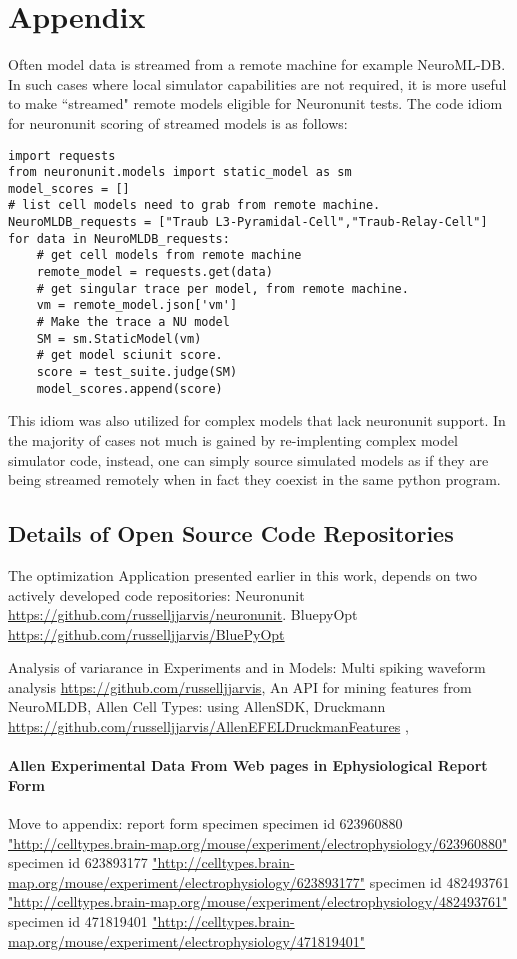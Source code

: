 \chapter{Appendix}

Often model data is streamed from a remote machine for example NeuroML-DB. In such cases where local simulator capabilities are not required, it is more useful to make ``streamed" remote models eligible for Neuronunit tests. The code idiom for neuronunit scoring of  streamed models is as follows:

\begin{verbatim}
import requests
from neuronunit.models import static_model as sm
model_scores = []
# list cell models need to grab from remote machine.
NeuroMLDB_requests = ["Traub L3-Pyramidal-Cell","Traub-Relay-Cell"]
for data in NeuroMLDB_requests:
    # get cell models from remote machine    
    remote_model = requests.get(data)
    # get singular trace per model, from remote machine.
    vm = remote_model.json['vm']
    # Make the trace a NU model
    SM = sm.StaticModel(vm)
    # get model sciunit score.
    score = test_suite.judge(SM)
    model_scores.append(score)
\end{verbatim}
\label{code:idiom2}

This idiom was also utilized for complex models that lack neuronunit support. In the majority of cases not much is gained by re-implenting complex model simulator code, instead, one can simply source simulated models as if they are being streamed remotely when in fact they coexist in the same python program.

\section{Details of Open Source Code Repositories}
The optimization Application presented earlier in this work, depends on two actively developed code repositories:
Neuronunit \url{https://github.com/russelljjarvis/neuronunit}.
BluepyOpt \url{https://github.com/russelljjarvis/BluePyOpt}

Analysis of variarance in Experiments and in Models:
Multi spiking waveform analysis \url{https://github.com/russelljjarvis},
An API for mining features from NeuroMLDB, Allen Cell Types: using AllenSDK, Druckmann \url{https://github.com/russelljjarvis/AllenEFELDruckmanFeatures}
\cite{birgiolas2019towards}, \cite{birgiolas2016rapid} \cite{druckmann2007novel}

\subsubsection{Allen Experimental Data From Web pages in Ephysiological Report Form}
Move to appendix: report form specimen
specimen id 623960880  \url{"http://celltypes.brain-map.org/mouse/experiment/electrophysiology/623960880"}
specimen id 623893177 
\url{"http://celltypes.brain-map.org/mouse/experiment/electrophysiology/623893177"}
specimen id 482493761
\url{"http://celltypes.brain-map.org/mouse/experiment/electrophysiology/482493761"}
specimen id 471819401
\url{"http://celltypes.brain-map.org/mouse/experiment/electrophysiology/471819401"}
\label{sec:allen_report_data}

